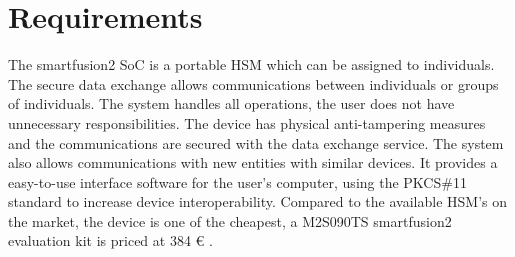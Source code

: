 
\section{Requirements}\label{chap:evaluation:requirements}

The smartfusion2 SoC is a portable HSM which can be assigned to individuals.
The secure data exchange allows communications between individuals or groups of individuals.
The system handles all operations, the user does not have unnecessary responsibilities.
The device has physical anti-tampering measures and the communications are secured with the data exchange service.
The system also allows communications with new entities with similar devices.
It provides a easy-to-use interface software for the user's computer, using the PKCS\#11 standard to increase device interoperability.
Compared to the available HSM's on the market, the device is one of the cheapest, a M2S090TS smartfusion2 evaluation kit is priced at 384 € \cite{smartfusionPrice}.


